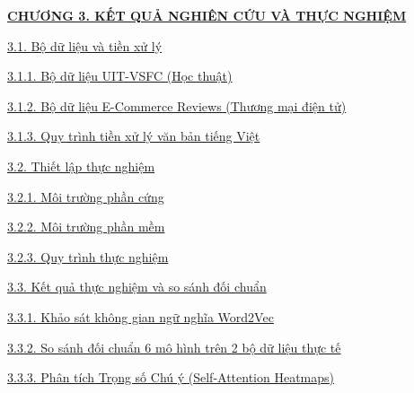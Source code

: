 \documentclass[12pt,a4paper]{article}
\begin{document}
{\noindent\hyperref[sec:chuong3]{\textbf{CHƯƠNG 3. KẾT QUẢ NGHIÊN CỨU VÀ THỰC NGHIỆM} \dotfill \textbf{\pageref*{sec:chuong3}}}\par
\hspace*{0.8cm}\hyperref[sec:datasets_prep]{3.1. Bộ dữ liệu và tiền xử lý \dotfill \pageref*{sec:datasets_prep}}\par
\hspace*{1.6cm}\hyperref[sec:uit_vsfc_dataset]{3.1.1. Bộ dữ liệu UIT-VSFC (Học thuật) \dotfill \pageref*{sec:uit_vsfc_dataset}}\par
\hspace*{1.6cm}\hyperref[sec:ecommerce_dataset]{3.1.2. Bộ dữ liệu E-Commerce Reviews (Thương mại điện tử) \dotfill \pageref*{sec:ecommerce_dataset}}\par
\hspace*{1.6cm}\hyperref[sec:preprocessing_steps]{3.1.3. Quy trình tiền xử lý văn bản tiếng Việt \dotfill \pageref*{sec:preprocessing_steps}}\par
\hspace*{0.8cm}\hyperref[sec:experimental_setup]{3.2. Thiết lập thực nghiệm \dotfill \pageref*{sec:experimental_setup}}\par
\hspace*{1.6cm}\hyperref[sec:hardware_env]{3.2.1. Môi trường phần cứng \dotfill \pageref*{sec:hardware_env}}\par
\hspace*{1.6cm}\hyperref[sec:software_env]{3.2.2. Môi trường phần mềm \dotfill \pageref*{sec:software_env}}\par
\hspace*{1.6cm}\hyperref[sec:experiment_pipeline]{3.2.3. Quy trình thực nghiệm \dotfill \pageref*{sec:experiment_pipeline}}\par
\hspace*{0.8cm}\hyperref[sec:results_benchmarking]{3.3. Kết quả thực nghiệm và so sánh đối chuẩn \dotfill \pageref*{sec:results_benchmarking}}\par
\hspace*{1.6cm}\hyperref[sec:word2vec_semantic_eval]{3.3.1. Khảo sát không gian ngữ nghĩa Word2Vec \dotfill \pageref*{sec:word2vec_semantic_eval}}\par
\hspace*{1.6cm}\hyperref[sec:model_benchmark_results]{3.3.2. So sánh đối chuẩn 6 mô hình trên 2 bộ dữ liệu thực tế \dotfill \pageref*{sec:model_benchmark_results}}\par
\hspace*{1.6cm}\hyperref[sec:attention_heatmaps_analysis]{3.3.3. Phân tích Trọng số Chú ý (Self-Attention Heatmaps) \dotfill \pageref*{sec:attention_heatmaps_analysis}}\par
}
\end{document}
